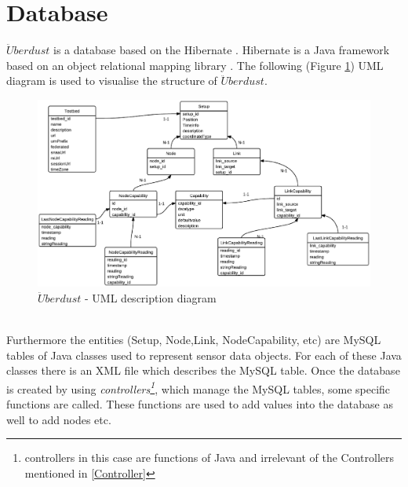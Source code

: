 \documentclass[12pt,a4paper]{report}
\begin{document}
\section{Database}
%
$\ddot{U}berdust$ is a database based on the Hibernate \cite{website:hibernate}. Hibernate is a Java framework based on an object relational mapping library \cite{website:hibernate-wiki}. The following (Figure \ref{uberdust-uml}) UML diagram is used to visualise the structure of $\ddot{U}berdust$.
%
\begin{figure}[H]
\centering
\includegraphics*[scale=0.4]{wisedb2}
\caption{$\ddot{U}berdust$ - UML description diagram}
\label{uberdust-uml}
\end{figure}
\ \\
Furthermore the entities (Setup, Node,Link, NodeCapability, etc) are MySQL tables of Java classes used to represent sensor data objects.
For each of these Java classes there is an XML file which describes the MySQL table.
Once the database is created by using \textit{controllers\footnote{controllers in this case are functions of Java and irrelevant of the Controllers mentioned in \ref{Controller}}}, which manage the MySQL tables, some specific functions are called. These functions are used to add values into the database as well to add nodes etc. 
%
\newpage
%
\end{document}
